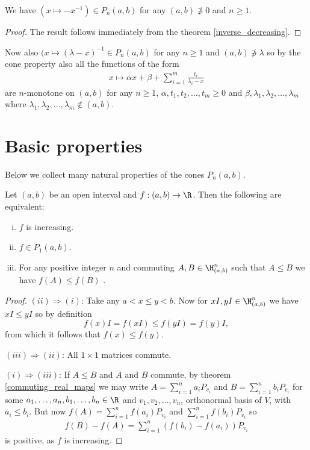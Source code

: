 \begin{prop}
	We have $(x \mapsto -x^{-1}) \in P_{n}(a, b)$ for any $(a, b) \not\ni 0$ and $n \geq 1$.
\end{prop}
\begin{proof}
	The result follows immediately from the theorem \ref{inverse_decreasing}.
\end{proof}

Now also $(x \mapsto (\lambda - x)^{-1} \in P_{n}(a, b)$ for any $n \geq 1$ and $(a, b) \not\ni \lambda$ so by the cone property also all the functions of the form
\begin{align}\label{finite_pick}
	x \mapsto \alpha x + \beta + \sum_{i = 1}^{m} \frac{t_{i}}{\lambda_{i} - x}
\end{align}
are $n$-monotone on $(a, b)$ for any $n \geq 1$, $\alpha, t_{1}, t_{2}, \ldots, t_{m} \geq 0$ and $\beta, \lambda_{1}, \lambda_{2}, \ldots, \lambda_{m}$ where $\lambda_{1}, \lambda_{2}, \ldots, \lambda_{m} \not\in (a, b)$.

\section{Basic properties}

Below we collect many natural properties of the cones $P_{n}(a, b)$.

\begin{prop}
	Let $(a, b)$ be an open interval and $f : (a, b) \to \R$. Then the following are equivalent:
	\begin{enumerate}[(i)]
		\item $f$ is increasing.
		\item $f \in P_{1}(a, b)$.
		\item For any positive integer $n$ and commuting $A, B \in \H^{n}_{(a, b)}$ such that $A \leq B$ we have $f(A) \leq f(B)$ .
	\end{enumerate}
\end{prop}
\begin{proof}
	$(ii) \Rightarrow (i)$: Take any $a < x \leq y < b$. Now for $xI, yI \in \H^{n}_{(a, b)}$ we have $x I \leq y I$ so by definition
	\[
		f(x) I = f(xI) \leq f(y I) = f(y) I,
	\]
	from which it follows that $f(x) \leq f(y)$.

	$(iii) \Rightarrow (ii)$: All $1 \times 1$ matrices commute.
	

	$(i) \Rightarrow (iii)$: If $A \leq B$ and $A$ and $B$ commute, by theorem \ref{commuting_real_maps} we may write $A = \sum_{i = 1}^{n} a_{i} P_{v_{i}}$ and $B = \sum_{i = 1}^{n} b_{i} P_{v_{i}}$ for some $a_{1}, \ldots, a_{n}, b_{1}, \ldots, b_{n} \in \R$ and $v_{1}, v_{2}, \ldots, v_{n}$, orthonormal basis of $V$, with $a_{i} \leq b_{i}$. But now $f(A) = \sum_{i = 1}^{n} f(a_{i}) P_{v_{i}}$ and $\sum_{i = 1}^{n} f(b_{i}) P_{v_{i}}$ so
	\begin{align*}
		f(B) - f(A) = \sum_{i = 1}^{n} (f(b_{i}) - f(a_{i})) P_{v_{i}}
	\end{align*}
	is positive, as $f$ is increasing.
\end{proof}


